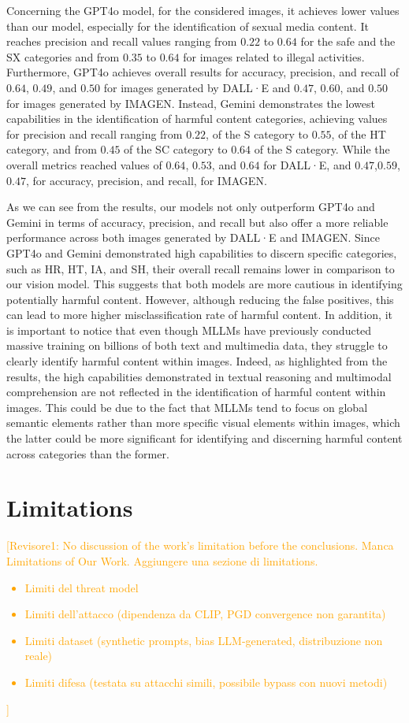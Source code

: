 \documentclass[acmsmall]{acmart}
\newcommand{\dalle}{DALL·E\xspace}
\newcommand{\imagen}{IMAGEN\xspace}
\newcommand{\revone}[1]{\textcolor{orange}{[Revisore1: #1]}}
\begin{document}
{Concerning the GPT4o model, for the considered images, it achieves lower values than our model, especially for the identification of sexual media content. It reaches precision and recall values ranging from $0.22$ to $0.64$ for the safe and the SX categories and from $0.35$ to $0.64$ for images related to illegal activities. Furthermore, GPT4o achieves overall results for accuracy, precision, and recall of $0.64$, $0.49$, and $0.50$ for images generated by \dalle and $0.47$, $0.60$, and $0.50$ for images generated by \imagen. Instead, Gemini demonstrates the lowest capabilities in the identification of harmful content categories, achieving values for precision and recall ranging from $0.22$, of the S category to $0.55$, of the HT category, and from $0.45$ of the SC category to $0.64$ of the S category. While the overall metrics reached values of $0.64$, $0.53$, and $0.64$ for \dalle, and  $0.47$,$0.59$, $0.47$, for accuracy, precision, and recall, for \imagen.

As we can see from the results, our models not only outperform GPT4o and Gemini in terms of accuracy, precision, and recall but also offer a more reliable performance across both images generated by \dalle and \imagen. 
Since GPT4o and Gemini demonstrated high capabilities to discern specific categories, such as HR, HT, IA, and SH, their overall recall remains lower in comparison to our vision model. This suggests that both models are more cautious in identifying potentially harmful content. However, although reducing the false positives, this can lead to more higher misclassification rate of harmful content.
In addition, it is important to notice that even though MLLMs have previously conducted massive training on billions of both text and multimedia data, they struggle to clearly identify harmful content within images. Indeed, as highlighted from the results, the high capabilities demonstrated in textual reasoning and multimodal comprehension are not reflected in the identification of harmful content within images. This could be due to the fact that MLLMs tend to focus on global semantic elements rather than more specific visual elements within images, which the latter could be more significant for identifying and discerning harmful content across categories than the former.



\section{Limitations}
\revone{
No discussion of the work’s limitation before the conclusions.
Manca Limitations of Our Work. Aggiungere una sezione di limitations.
\begin{itemize}
    \item Limiti del threat model
    \item Limiti dell’attacco (dipendenza da CLIP, PGD convergence non garantita)
    \item Limiti dataset (synthetic prompts, bias LLM-generated, distribuzione non reale)
    \item Limiti difesa (testata su attacchi simili, possibile bypass con nuovi metodi)
\end{itemize}
}

}
\end{document}

